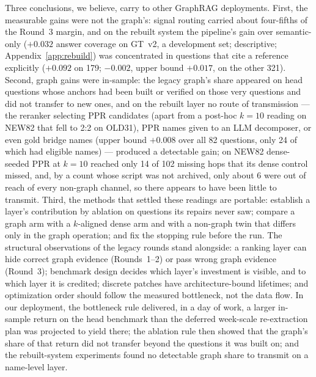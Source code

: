 Three conclusions, we believe, carry to other GraphRAG deployments.
First, the measurable gains were not the graph's: signal routing
carried about four-fifths of the Round~3 margin, and on the rebuilt
system the pipeline's gain over
semantic-only ($+0.032$ answer coverage on GT~v2, a development set;
descriptive; Appendix~\ref{app:rebuild}) was concentrated in questions
that cite a reference explicitly ($+0.092$ on 179; $-0.002$, upper
bound $+0.017$, on the other 321). Second,
graph gains were in-sample: the legacy graph's share appeared on head
questions whose anchors had been built or verified on those very
questions and did not transfer to new ones, and on the rebuilt layer
no route of transmission --- the reranker selecting PPR candidates
(apart from a post-hoc $k=10$ reading on NEW82 that fell to 2:2 on
OLD31), PPR names given to an LLM decomposer, or even gold bridge names
(upper bound $+0.008$ over all 82 questions, only 24 of which had
eligible names) --- produced a detectable gain; on NEW82 dense-seeded
PPR at $k=10$ reached only 14 of 102 missing hops that its dense control
missed, and, by a count whose script was not archived, only about 6
were out of reach of every non-graph channel, so there appears to have been
little to transmit. Third, the methods that settled
these readings are portable: establish a layer's contribution by
ablation on questions its repairs never saw; compare a graph arm with a
$k$-aligned dense arm and with a non-graph twin that differs only in
the graph operation; and fix the stopping rule before the run. The
structural observations of the legacy rounds stand alongside: a ranking
layer can hide correct graph evidence (Rounds~1--2) or pass wrong graph
evidence (Round~3); benchmark design decides which layer's investment
is visible, and to which layer it is credited; discrete patches have
architecture-bound lifetimes; and optimization order should follow the
measured bottleneck, not the data flow. In our deployment, the
bottleneck rule delivered, in a day of work, a larger in-sample return
on the head benchmark than the deferred week-scale re-extraction plan
was projected to yield there; the ablation rule then showed that the
graph's share of that return did not transfer beyond the questions it
was built on; and the rebuilt-system experiments found no detectable
graph share to transmit on a name-level layer.
